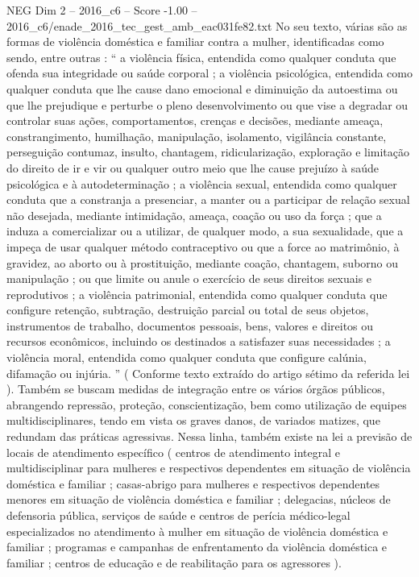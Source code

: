 \begin{textsample}{NEG Dim 2 – 2016\_c6 – Score -1.00 – 2016\_c6/enade\_2016\_tec\_gest\_amb\_eac031fe82.txt}
No seu texto, várias são as formas de violência doméstica e familiar contra a mulher, identificadas como sendo, entre outras : “ a violência física, entendida como qualquer conduta que ofenda sua integridade ou saúde corporal ; a violência psicológica, entendida como qualquer conduta que lhe cause dano emocional e diminuição da autoestima ou que lhe prejudique e perturbe o pleno desenvolvimento ou que vise a degradar ou controlar suas ações, comportamentos, crenças e decisões, mediante ameaça, constrangimento, humilhação, manipulação, isolamento, vigilância constante, perseguição contumaz, insulto, chantagem, ridicularização, exploração e limitação do direito de ir e vir ou qualquer outro meio que lhe cause prejuízo à saúde psicológica e à autodeterminação ; a violência sexual, entendida como qualquer conduta que a constranja a presenciar, a manter ou a participar de relação sexual não desejada, mediante intimidação, ameaça, coação ou uso da força ; que a induza a comercializar ou a utilizar, de qualquer modo, a sua sexualidade, que a impeça de usar qualquer método contraceptivo ou que a force ao matrimônio, à gravidez, ao aborto ou à prostituição, mediante coação, chantagem, suborno ou manipulação ; ou que limite ou anule o exercício de seus direitos sexuais e reprodutivos ; a violência patrimonial, entendida como qualquer conduta que configure retenção, subtração, destruição parcial ou total de seus objetos, instrumentos de trabalho, documentos pessoais, bens, valores e direitos ou recursos econômicos, incluindo os destinados a satisfazer suas necessidades ; a violência moral, entendida como qualquer conduta que configure calúnia, difamação ou injúria. ” ( Conforme texto extraído do artigo sétimo da referida lei ).
Também se buscam medidas de integração entre os vários órgãos públicos, abrangendo repressão, proteção, conscientização, bem como utilização de equipes multidisciplinares, tendo em vista os graves danos, de variados matizes, que redundam das práticas agressivas.
Nessa linha, também existe na lei a previsão de locais de atendimento específico ( centros de atendimento integral e multidisciplinar para mulheres e respectivos dependentes em situação de violência doméstica e familiar ; casas-abrigo para mulheres e respectivos dependentes menores em situação de violência doméstica e familiar ; delegacias, núcleos de defensoria pública, serviços de saúde e centros de perícia médico-legal especializados no atendimento à mulher em situação de violência doméstica e familiar ; programas e campanhas de enfrentamento da violência doméstica e familiar ; centros de educação e de reabilitação para os agressores ).

\end{textsample}
